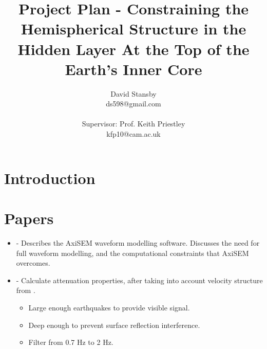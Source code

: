 \documentclass[11pt,a4paper]{article}
\begin{document}
\title{Project Plan - Constraining the Hemispherical Structure in the Hidden Layer At the Top of the Earth's Inner Core}
\author{David Stansby \\ ds598@gmail.com \\  \\ Supervisor: Prof. Keith Priestley \\ kfp10@cam.ac.uk }
\maketitle

\begin{abstract}
\end{abstract}

\section{Introduction}


\section{Papers}
\begin{itemize}
	\item \cite{Nissen-Meyer2014} - Describes the AxiSEM waveform modelling software. Discusses the need for full waveform modelling, and the computational constraints that AxiSEM overcomes.

	\item \cite{Waszek2013a} - Calculate attenuation properties, after taking into account velocity structure from \cite{Waszek2011a}.
\begin{itemize}
	\item Large enough earthquakes to provide visible signal.
	\item Deep enough to prevent surface reflection interference.
	\item Filter from 0.7 Hz to 2 Hz.
\end{itemize}

\end{itemize}


\end{document}
